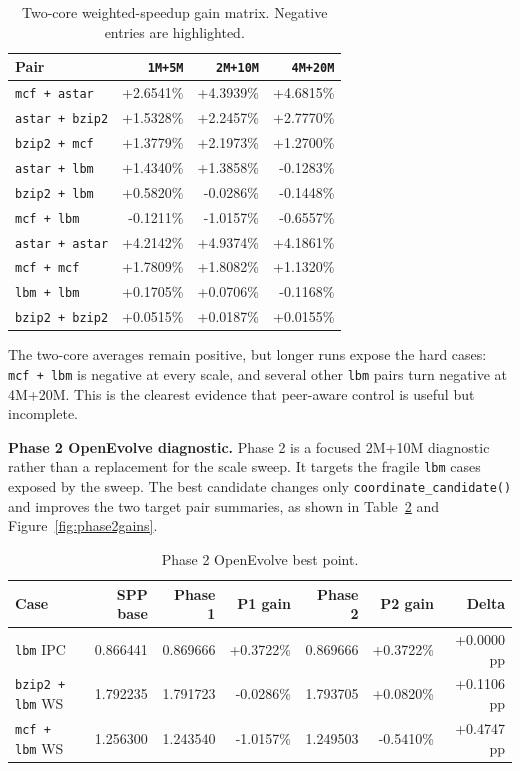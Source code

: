 \documentclass[10pt,letterpaper]{article}
\newcommand{\pct}[1]{#1\%}
\newcommand{\code}[1]{\texttt{#1}}
\newcommand{\loss}[1]{\textcolor{bwcCoral}{#1}}
\begin{document}
\begin{table}[!htbp]
\centering
\scriptsize
\caption{Two-core weighted-speedup gain matrix. Negative entries are highlighted.}
\label{tab:pairmatrix}
\begin{tabular}{@{}lrrr@{}}
\toprule
Pair & \code{1M+5M} & \code{2M+10M} & \code{4M+20M} \\
\midrule
\code{mcf + astar} & \pct{+2.6541} & \pct{+4.3939} & \pct{+4.6815} \\
\code{astar + bzip2} & \pct{+1.5328} & \pct{+2.2457} & \pct{+2.7770} \\
\code{bzip2 + mcf} & \pct{+1.3779} & \pct{+2.1973} & \pct{+1.2700} \\
\code{astar + lbm} & \pct{+1.4340} & \pct{+1.3858} & \loss{\pct{-0.1283}} \\
\code{bzip2 + lbm} & \pct{+0.5820} & \loss{\pct{-0.0286}} & \loss{\pct{-0.1448}} \\
\code{mcf + lbm} & \loss{\pct{-0.1211}} & \loss{\pct{-1.0157}} & \loss{\pct{-0.6557}} \\
\code{astar + astar} & \pct{+4.2142} & \pct{+4.9374} & \pct{+4.1861} \\
\code{mcf + mcf} & \pct{+1.7809} & \pct{+1.8082} & \pct{+1.1320} \\
\code{lbm + lbm} & \pct{+0.1705} & \pct{+0.0706} & \loss{\pct{-0.1168}} \\
\code{bzip2 + bzip2} & \pct{+0.0515} & \pct{+0.0187} & \pct{+0.0155} \\
\bottomrule
\end{tabular}
\end{table}
The two-core averages remain positive, but longer runs expose the hard cases:
\code{mcf + lbm} is negative at every scale, and several other \code{lbm} pairs
turn negative at 4M+20M. This is the clearest evidence that peer-aware control
is useful but incomplete.

\noindent\textbf{Phase 2 OpenEvolve diagnostic.}
Phase 2 is a focused 2M+10M diagnostic rather than a replacement for the scale
sweep. It targets the fragile \code{lbm} cases exposed by the sweep. The best
candidate changes only \code{coordinate\_candidate()} and improves the two
target pair summaries, as shown in Table~\ref{tab:phase2} and
Figure~\ref{fig:phase2gains}.

\begin{table}[!htbp]
\centering
\scriptsize
\caption{Phase 2 OpenEvolve best point.}
\label{tab:phase2}
\begin{tabular}{@{}lrrrrrr@{}}
\toprule
Case & SPP base & Phase 1 & P1 gain & Phase 2 & P2 gain & Delta \\
\midrule
\code{lbm} IPC & 0.866441 & 0.869666 & \pct{+0.3722} & 0.869666 & \pct{+0.3722} & +0.0000 pp \\
\code{bzip2 + lbm} WS & 1.792235 & 1.791723 & \pct{-0.0286} & 1.793705 & \pct{+0.0820} & +0.1106 pp \\
\code{mcf + lbm} WS & 1.256300 & 1.243540 & \pct{-1.0157} & 1.249503 & \pct{-0.5410} & +0.4747 pp \\
\bottomrule
\end{tabular}
\end{table}
\end{document}
